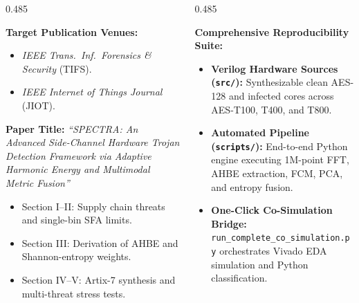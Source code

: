 \documentclass[aspectratio=169,11pt]{beamer}
\begin{document}
\begin{frame}[t]
  \vspace*{-0.15cm}

  \begin{columns}[T, onlytextwidth]
    \begin{column}{0.485\textwidth}
      \begin{glassbox}[top=2pt, bottom=2pt, left=6pt, right=6pt, title={Prepared Publication Manuscript}]{}
        \textbf{Target Publication Venues:}
        \begin{itemize}\setlength{\itemsep}{1.2pt}
          \item \textit{IEEE Trans.\ Inf.\ Forensics \& Security} (TIFS).
          \item \textit{IEEE Internet of Things Journal} (JIOT).
        \end{itemize}
        \vspace{1.5pt}
        \textbf{Paper Title:}
        \textit{``SPECTRA: An Advanced Side-Channel Hardware Trojan Detection Framework via Adaptive Harmonic Energy and Multimodal Metric Fusion''}
        \begin{itemize}\setlength{\itemsep}{1.0pt}
          \item Section I--II: Supply chain threats and single-bin SFA limits.
          \item Section III: Derivation of AHBE and Shannon-entropy weights.
          \item Section IV--V: Artix-7 synthesis and multi-threat stress tests.
        \end{itemize}
      \end{glassbox}
    \end{column}

    \begin{column}{0.485\textwidth}
      \begin{glassbox}[top=2pt, bottom=2pt, left=6pt, right=6pt, title={Open-Source Artifacts \& Reproducibility}]{}
        \textbf{Comprehensive Reproducibility Suite:}
        \begin{itemize}\setlength{\itemsep}{1.2pt}
          \item \textbf{Verilog Hardware Sources (\texttt{src/}):}
            Synthesizable clean AES-128 and infected cores across AES-T100, T400, and T800.
          \item \textbf{Automated Pipeline (\texttt{scripts/}):}
            End-to-end Python engine executing 1M-point FFT, AHBE extraction, FCM, PCA, and entropy fusion.
          \item \textbf{One-Click Co-Simulation Bridge:}
            \texttt{run\_complete\_co\_simulation.py} orchestrates Vivado EDA simulation and Python classification.
        \end{itemize}
      \end{glassbox}
    \end{column}
  \end{columns}
\end{frame}
\end{document}
